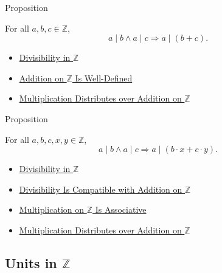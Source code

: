 \begin{propositionbox}{Proposition}
\begin{proposition}
\label{prop:divisibility-compatible-with-addition-on-z}
For all $a,b,c\in\mathbb{Z}$,
\[
a\mid b\land a\mid c \Longrightarrow a\mid(b+c).
\]
\end{proposition}
\end{propositionbox}

\begin{dependencies}
\begin{itemize}
  \item \hyperref[def:divisibility-in-z]{Divisibility in $\mathbb{Z}$}
  \item \hyperref[thm:addition-on-z-well-defined]{Addition on $\mathbb{Z}$ Is Well-Defined}
  \item \hyperref[thm:multiplication-distributes-over-addition-on-z]{Multiplication Distributes over Addition on $\mathbb{Z}$}
\end{itemize}
\end{dependencies}

\begin{propositionbox}{Proposition}
\begin{proposition}
\label{prop:divisibility-respects-linear-combinations-on-z}
For all $a,b,c,x,y\in\mathbb{Z}$,
\[
a\mid b\land a\mid c \Longrightarrow a\mid(b\cdot x+c\cdot y).
\]
\end{proposition}
\end{propositionbox}

\begin{dependencies}
\begin{itemize}
  \item \hyperref[def:divisibility-in-z]{Divisibility in $\mathbb{Z}$}
  \item \hyperref[prop:divisibility-compatible-with-addition-on-z]{Divisibility Is Compatible with Addition on $\mathbb{Z}$}
  \item \hyperref[thm:multiplication-on-z-associative]{Multiplication on $\mathbb{Z}$ Is Associative}
  \item \hyperref[thm:multiplication-distributes-over-addition-on-z]{Multiplication Distributes over Addition on $\mathbb{Z}$}
\end{itemize}
\end{dependencies}

\subsection*{\texorpdfstring{Units in $\mathbb{Z}$}{Units in Z}}

